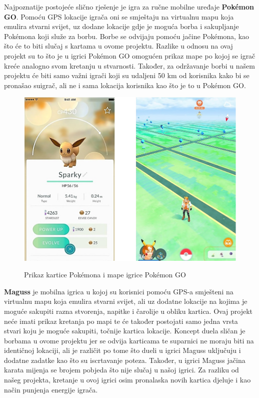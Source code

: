 		
		\textnormal{Najpoznatije postojeće slično rješenje je igra za ručne mobilne uređaje \textbf{Pokémon GO}. Pomoću GPS lokacije igrača oni se smještaju na virtualnu mapu koja emulira stvarni svijet, uz dodane lokacije gdje je moguća borba i sakupljanje Pokémona koji služe za borbu. Borbe se odvijaju pomoću jačine Pokémona, kao što će to biti slučaj s kartama u ovome projektu. Razlike u odnosu na ovaj projekt su to što je u igrici Pokémon GO omogućen prikaz mape po kojoj se igrač kreće analogno svom kretanju u stvarnosti. Također, za održavanje borbi u našem projektu će biti samo važni igrači koji su udaljeni 50 km od korisnika kako bi se pronašao suigrač, ali ne i sama lokacija korisnika kao što je to u Pokémon GO.    }
		
		\begin{figure}[H]
			\centering
			\includegraphics[scale=0.6]{slike/PokemonGO} \\%
			\caption{Prikaz kartice Pokémona i mape igrice Pokémon GO}
			\label{fig:PokemonGO} %
		\end{figure}
	
		\textnormal{\textbf{Maguss} je mobilna igrica u kojoj su korisnici pomoću GPS-a smješteni na virtualnu mapu koja emulira stvarni svijet, ali uz dodatne lokacije na kojima je moguće sakupiti razna stvorenja, napitke i čarolije u obliku kartica. Ovaj projekt neće imati prikaz kretanja po mapi te će također postojati samo jedna vrsta stvari koju je moguće sakupiti, točnije kartica lokacije. Koncept duela sličan je borbama u ovome projektu jer se odvija karticama te suparnici ne moraju biti na identičnoj lokaciji, ali je različit po tome što dueli u igrici Maguss uključuju i dodatne zadatke kao što su iscrtavanje poteza. Također, u igrici Maguss jačina karata mijenja se brojem pobjeda što nije slučaj u našoj igrici. Za razliku od našeg projekta, kretanje u ovoj igrici osim pronalaska novih kartica djeluje i kao način punjenja energije igrača.}\\
		
